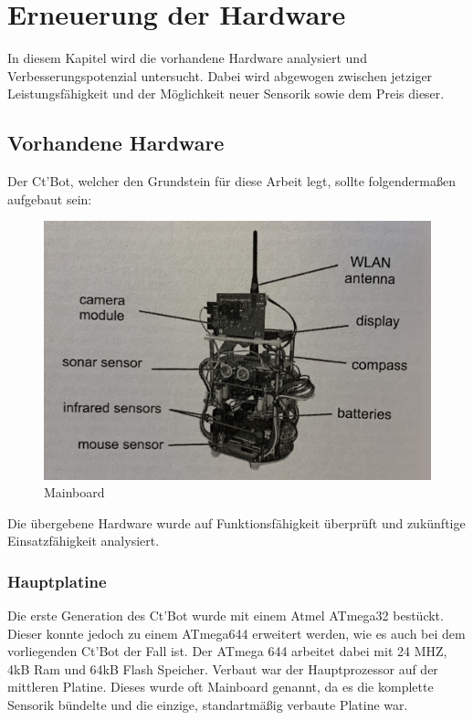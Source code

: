 \documentclass[twoside,12pt,a4paper]{report}
\begin{document}
	\section{Erneuerung der Hardware}
	In diesem Kapitel wird die vorhandene Hardware analysiert und Verbesserungspotenzial untersucht. Dabei wird abgewogen zwischen jetziger Leistungsfähigkeit und der Möglichkeit neuer Sensorik sowie dem Preis dieser. 
	
	\subsection{Vorhandene Hardware}
	Der Ct'Bot, welcher den Grundstein für diese Arbeit legt, sollte folgendermaßen aufgebaut sein:
	
	\begin{figure}[!htb]
		\centering
		\includegraphics[scale=0.1]{images/CBot_mod.jpg}
		\caption{Mainboard}
	\end{figure}
	
	Die übergebene Hardware wurde auf Funktionsfähigkeit überprüft und zukünftige Einsatzfähigkeit analysiert. 
	
	\subsubsection{Hauptplatine}
	Die erste Generation des Ct'Bot wurde mit einem Atmel ATmega32 bestückt. Dieser konnte jedoch zu einem ATmega644 erweitert werden, wie es auch bei dem vorliegenden Ct'Bot der Fall ist. Der ATmega 644 arbeitet dabei mit 24 MHZ, 4kB Ram und 64kB Flash Speicher. Verbaut war der Hauptprozessor auf der mittleren Platine. Dieses wurde oft Mainboard genannt, da es die komplette Sensorik bündelte und die einzige, standartmäßig verbaute Platine war. 
	
\end{document}
